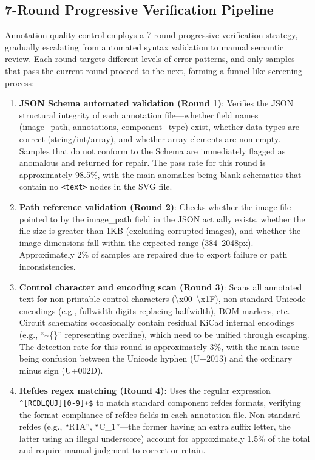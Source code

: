 \subsection{7-Round Progressive Verification Pipeline}

Annotation quality control employs a 7-round progressive verification strategy, gradually escalating from automated syntax validation to manual semantic review. Each round targets different levels of error patterns, and only samples that pass the current round proceed to the next, forming a funnel-like screening process:

\begin{enumerate}[nosep]
    \item \textbf{JSON Schema automated validation (Round 1)}: Verifies the JSON structural integrity of each annotation file---whether field names (image\_path, annotations, component\_type) exist, whether data types are correct (string/int/array), and whether array elements are non-empty. Samples that do not conform to the Schema are immediately flagged as anomalous and returned for repair. The pass rate for this round is approximately 98.5\%, with the main anomalies being blank schematics that contain no \texttt{<text>} nodes in the SVG file.
    \item \textbf{Path reference validation (Round 2)}: Checks whether the image file pointed to by the image\_path field in the JSON actually exists, whether the file size is greater than 1KB (excluding corrupted images), and whether the image dimensions fall within the expected range (384--2048px). Approximately 2\% of samples are repaired due to export failure or path inconsistencies.
    \item \textbf{Control character and encoding scan (Round 3)}: Scans all annotated text for non-printable control characters (\textbackslash x00--\textbackslash x1F), non-standard Unicode encodings (e.g., fullwidth digits replacing halfwidth), BOM markers, etc. Circuit schematics occasionally contain residual KiCad internal encodings (e.g., ``\textasciitilde\{\}'' representing overline), which need to be unified through escaping. The detection rate for this round is approximately 3\%, with the main issue being confusion between the Unicode hyphen (U+2013) and the ordinary minus sign (U+002D).
    \item \textbf{Refdes regex matching (Round 4)}: Uses the regular expression \texttt{\^{}[RCDLQUJ][0-9]+\$} to match standard component refdes formats, verifying the format compliance of refdes fields in each annotation file. Non-standard refdes (e.g., ``R1A'', ``C\_1''---the former having an extra suffix letter, the latter using an illegal underscore) account for approximately 1.5\% of the total and require manual judgment to correct or retain.

\end{enumerate}
